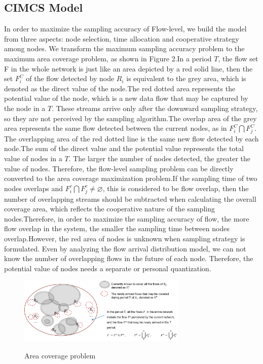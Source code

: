 \documentclass[conference]{IEEEtran}
\begin{document}
\subsection{CIMCS  Model}
In order to maximize the sampling accuracy of Flow-level, we build the model from three aspects: node selection, time allocation and cooperative strategy among nodes. We transform the maximum sampling accuracy problem to the maximum area coverage problem, as shown in Figure 2.In a period $T$, the flow set F in the whole network is just like an area depicted by a red solid line, then the set $F_i^ C$ of the flow detected by node $R_i$ is equivalent to the grey area, which is denoted as the direct value of the node.The red dotted area represents the potential value of the node, which is a new data flow that may be captured by the node in a $T$. These streams arrive only after the downward sampling strategy, so they are not perceived by the sampling algorithm.The overlap area of the grey area represents the same flow detected between the current nodes, as in $F_i ^ C \bigcap F_j ^ C$. The overlapping area of the red dotted line is the same new flow detected by each node.The sum of the direct value and the potential value represents the total value of nodes in a $T$. The larger the number of nodes detected, the greater the value of nodes. Therefore, the flow-level sampling problem can be directly converted to the area coverage maximization problem.If the sampling time of two nodes overlaps and $F^c_i \bigcap F^c_j \ne \varnothing $, this is considered to be flow overlap, then the number of overlapping streams should be subtracted when calculating the overall coverage area, which reflects the cooperative nature of the sampling nodes.Therefore, in order to maximize the sampling accuracy of flow, the more flow overlap in the system, the smaller the sampling time between nodes overlap.However, the red area of nodes is unknown when sampling strategy is formulated. Even by analyzing the flow arrival distribution model, we can not know the number of overlapping flows in the future of each node. Therefore, the potential value of nodes needs a separate or personal quantization.
\begin{figure}[!!!!!!!!!!!!!!hhhhhhhhhht]
\centering

\includegraphics[width=8cm]{images/area_coverage.png}
\label{fig_1_area}

\caption{Area coverage problem}
\label{fig_1_model}
\end{figure}
\end{document}
